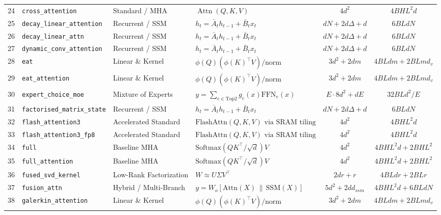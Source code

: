 \begin{center}
\begin{longtable}{rlllcc}
24 & \texttt{cross\_attention} & Standard / MHA & $\operatorname{Attn}(Q,K,V)$ & $4 d^2$ & $4 B H L^2 d$ \\
25 & \texttt{decay\_linear\_attention} & Recurrent / SSM & $h_t = \bar{A}_t h_{t-1} + \bar{B}_t x_t$ & $d N + 2 d \Delta + d$ & $6 B L d N$ \\
26 & \texttt{decay\_linear\_attn} & Recurrent / SSM & $h_t = \bar{A}_t h_{t-1} + \bar{B}_t x_t$ & $d N + 2 d \Delta + d$ & $6 B L d N$ \\
27 & \texttt{dynamic\_conv\_attention} & Recurrent / SSM & $h_t = \bar{A}_t h_{t-1} + \bar{B}_t x_t$ & $d N + 2 d \Delta + d$ & $6 B L d N$ \\
28 & \texttt{eat} & Linear \& Kernel & $\phi(Q)(\phi(K)^\top V) / \text{norm}$ & $3 d^2 + 2 d m$ & $4 B L d m + 2 B L m d_v$ \\
29 & \texttt{eat\_attention} & Linear \& Kernel & $\phi(Q)(\phi(K)^\top V) / \text{norm}$ & $3 d^2 + 2 d m$ & $4 B L d m + 2 B L m d_v$ \\
30 & \texttt{expert\_choice\_moe} & Mixture of Experts & $y = \sum_{e \in \text{Top2}} g_e(x) \text{FFN}_e(x)$ & $E \cdot 8 d^2 + d E$ & $32 B L d^2 / E$ \\
31 & \texttt{factorised\_matrix\_state} & Recurrent / SSM & $h_t = \bar{A}_t h_{t-1} + \bar{B}_t x_t$ & $d N + 2 d \Delta + d$ & $6 B L d N$ \\
32 & \texttt{flash\_attention3} & Accelerated Standard & $\text{FlashAttn}(Q,K,V) \text{ via SRAM tiling}$ & $4 d^2$ & $4 B H L^2 d$ \\
33 & \texttt{flash\_attention3\_fp8} & Accelerated Standard & $\text{FlashAttn}(Q,K,V) \text{ via SRAM tiling}$ & $4 d^2$ & $4 B H L^2 d$ \\
34 & \texttt{full} & Baseline MHA & $\text{Softmax}(Q K^\top / \sqrt{d}) V$ & $4 d^2$ & $4 B H L^2 d + 2 B H L^2$ \\
35 & \texttt{full\_attention} & Baseline MHA & $\text{Softmax}(Q K^\top / \sqrt{d}) V$ & $4 d^2$ & $4 B H L^2 d + 2 B H L^2$ \\
36 & \texttt{fused\_svd\_kernel} & Low-Rank Factorization & $W \approx U \Sigma V^\top$ & $2 d r + r$ & $4 B L d r + 2 B L r$ \\
37 & \texttt{fusion\_attn} & Hybrid / Multi-Branch & $y = W_o [\text{Attn}(X) \,\|\, \text{SSM}(X)]$ & $5 d^2 + 2 d d_{ssm}$ & $4 B H L^2 d + 6 B L d N$ \\
38 & \texttt{galerkin\_attention} & Linear \& Kernel & $\phi(Q)(\phi(K)^\top V) / \text{norm}$ & $3 d^2 + 2 d m$ & $4 B L d m + 2 B L m d_v$ \\

\end{longtable}
\end{center}
